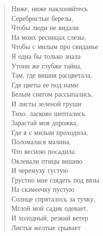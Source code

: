 \begin{verse}
\begin{altverse}
Ниже, ниже наклоняйтесь\\
Серебристые березы,\\
Чтобы люди не видали\\
На моих ресницах слезы;\\
Чтобы с милым про свиданье\\
Я одна бы только знала\ldotst\\
Утони же глубже тайна,\\
Там, где вишня расцветала,\\
Где цветы ее под нами\\
Белым снегом рассыпались,\\
И листы зеленой груши\\
Тихо, ласково шептались.\\
Зарастай моя дорожка,\\
Где я с милым проходила,\\
Поломалася малина,\\
Что весною посадила.\\
Оклевали птицы вишню\\
И черемуху густую\ldotst\\
Грустно мне глядеть под вязы\\
На скамеечку пустую\ldotse\\
Солнце спряталось за тучку,\\
Мглой мой садик одевает,\\
И холодный, резкий ветер\\
Листья желтые срывает\ldotst\\
\end{altverse}
\end{verse}


\newpage
\vspace*{0cm}


